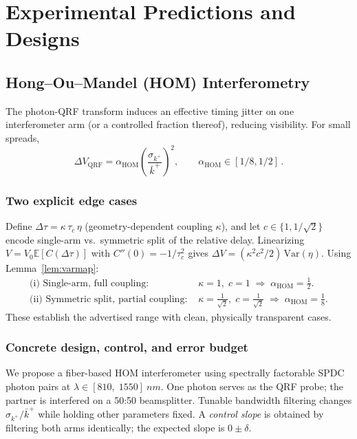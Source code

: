 \documentclass[aps,11pt]{article}
\newcommand{\Var}{\mathrm{Var}}
\newcommand{\E}{\mathbb{E}}
\newcommand{\kplus}{k^{+}}
\newcommand{\kbar}{\bar{k}^{+}}
\newcommand{\alphahom}{\alpha_{\text{HOM}}}
\begin{document}
\section{Experimental Predictions and Designs}\label{sec:experiments}

\subsection{Hong--Ou--Mandel (HOM) Interferometry}\label{sec:HOM}
The photon-QRF transform induces an effective timing jitter on one interferometer arm (or a controlled fraction thereof), reducing visibility. For small spreads,
\begin{equation}
\Delta V_{\text{QRF}}=\alphahom\!\left(\frac{\sigma_{\kplus}}{\kbar}\right)^{2}, \qquad \alphahom\in[1/8,1/2]\,.
\end{equation}

\subsubsection*{Two explicit edge cases}
Define \(\Delta\tau=\kappa\,\tau_c\,\eta\) (geometry-dependent coupling \(\kappa\)), and let \(c\in\{1,1/\sqrt2\}\) encode single-arm vs.\ symmetric split of the relative delay. Linearizing \(V=V_0\E[C(\Delta\tau)]\) with \(C''(0)=-1/\tau_c^2\) gives
\(\Delta V=(\kappa^2 c^2/2)\,\Var(\eta)\).
Using Lemma~\ref{lem:varmap}:
\begin{align*}
\text{(i) Single-arm, full coupling: } & \kappa=1,\; c=1 \;\Rightarrow\; \alphahom=\tfrac12.\\
\text{(ii) Symmetric split, partial coupling: } & \kappa=\tfrac{1}{\sqrt{2}},\; c=\tfrac{1}{\sqrt{2}} \;\Rightarrow\; \alphahom=\tfrac18.
\end{align*}
These establish the advertised range with clean, physically transparent cases.

\subsubsection*{Concrete design, control, and error budget}
We propose a fiber-based HOM interferometer using spectrally factorable SPDC photon pairs at \(\lambda\in[810,\;1550]~\si{nm}\). One photon serves as the QRF probe; the partner is interfered on a 50:50 beamsplitter. Tunable bandwidth filtering changes \(\sigma_{\kplus}/\kbar\) while holding other parameters fixed. A \emph{control slope} is obtained by filtering both arms identically; the expected slope is \(0\pm\delta\).
\end{document}
